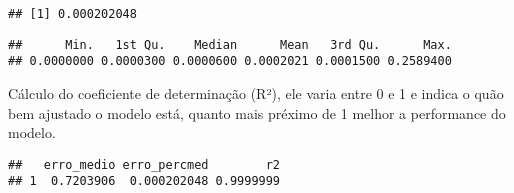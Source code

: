 \documentclass[
]{article}
\newenvironment{Shaded}{\begin{snugshade}}{\end{snugshade}}
\newcommand{\CommentTok}[1]{\textcolor[rgb]{0.56,0.35,0.01}{\textit{#1}}}
\newcommand{\KeywordTok}[1]{\textcolor[rgb]{0.13,0.29,0.53}{\textbf{#1}}}
\newcommand{\NormalTok}[1]{#1}
\newcommand{\OperatorTok}[1]{\textcolor[rgb]{0.81,0.36,0.00}{\textbf{#1}}}
\newcommand{\StringTok}[1]{\textcolor[rgb]{0.31,0.60,0.02}{#1}}
\begin{document}
\begin{verbatim}
## [1] 0.000202048
\end{verbatim}

\begin{Shaded}
\end{Shaded}

\begin{verbatim}
##      Min.   1st Qu.    Median      Mean   3rd Qu.      Max. 
## 0.0000000 0.0000300 0.0000600 0.0002021 0.0001500 0.2589400
\end{verbatim}

\n Cálculo do coeficiente de determinação (R²), ele varia entre 0 e 1 e
indica o quão bem ajustado o modelo está, quanto mais préximo de 1
melhor a performance do modelo.

\begin{Shaded}
\end{Shaded}

\begin{verbatim}
##   erro_medio erro_percmed        r2
## 1  0.7203906  0.000202048 0.9999999
\end{verbatim}
\end{document}
